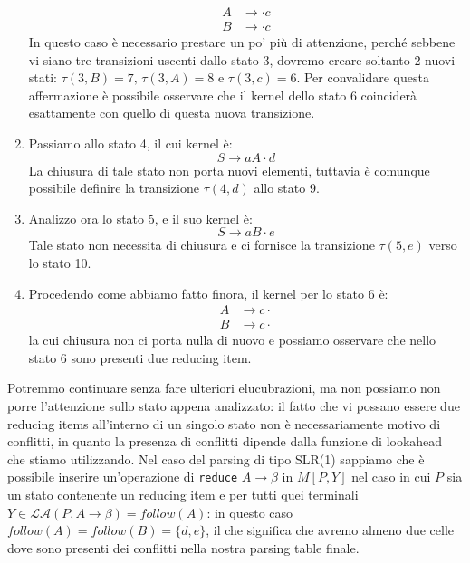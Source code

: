 \documentclass[class=book, crop=false, oneside, 12pt]{standalone}
\begin{document}
\begin{enumerate}
    \begin{align*}
        A &\to \cdot c \\
        B &\to \cdot c
    \end{align*}
    In questo caso è necessario prestare un po' più di attenzione, perché sebbene vi siano tre transizioni uscenti dallo stato 3, dovremo creare soltanto 2 nuovi stati: \(\tau(3,B)=7 \textrm{, } \tau(3,A)=8 \textrm{ e } \tau(3,c)=6\). Per convalidare questa affermazione è possibile osservare che il kernel dello stato 6 coinciderà esattamente con quello di questa nuova transizione.
    \item Passiamo allo stato 4, il cui kernel è:
    \begin{equation*}
        S \to aA \cdot d 
    \end{equation*}
   La chiusura di tale stato non porta nuovi elementi, tuttavia è comunque possibile definire la transizione \(\tau(4,d)\) allo stato 9.
    \item Analizzo ora lo stato 5, e il suo kernel è:
    \begin{equation*}
        S \to aB \cdot e
    \end{equation*}
    Tale stato non necessita di chiusura e ci fornisce la transizione \(\tau(5,e)\) verso lo stato 10.
    \item Procedendo come abbiamo fatto finora, il kernel per lo stato 6 è:
    \begin{align*}
        A &\to c \cdot \\
        B &\to c \cdot
    \end{align*}
    la cui chiusura non ci porta nulla di nuovo e possiamo osservare che nello stato 6 sono presenti due reducing item.
\end{enumerate}

Potremmo continuare senza fare ulteriori elucubrazioni, ma non possiamo non porre l'attenzione sullo stato appena analizzato: il fatto che vi possano essere due reducing items all'interno di un singolo stato non è necessariamente motivo di conflitti, in quanto la presenza di conflitti dipende dalla funzione di lookahead che stiamo utilizzando. Nel caso del parsing di tipo SLR(1) sappiamo che è possibile inserire un'operazione di \texttt{reduce} \(A \rightarrow \beta\) in \(M[P, Y]\) nel caso in cui \(P\) sia un stato contenente un reducing item e per tutti quei terminali \(Y \in \mathcal{LA}(P, A \rightarrow \beta) = follow(A)\): in questo caso \(follow(A) = follow(B) = \{d, e\}\), il che significa che avremo almeno due celle dove sono presenti dei conflitti nella nostra parsing table finale.
\end{document}
